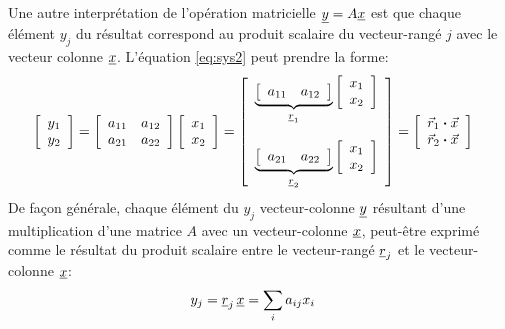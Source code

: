 Une autre interprétation de l'opération matricielle $\underline{y} = A \underline{x}$ est que chaque élément $y_j$ du résultat correspond au produit scalaire du vecteur-rangé $j$ avec le vecteur colonne $\underline{x}$. L'équation \eqref{eq:sys2} peut prendre la forme:
\begin{align}
\left[ \begin{array}{c} 
	y_1 \\ y_2
\end{array} \right] &= 
\left[ \begin{array}{c c} 
a_{11} & a_{12} \\ a_{21} & a_{22}
\end{array} \right]
\left[ \begin{array}{c} 
	x_1 \\ x_2
\end{array} \right] = 
\left[ \begin{array}{c} 
\underbrace{
\left[ \begin{array}{c c} 
a_{11} & a_{12} 
\end{array} \right]
}_{\underline{r}_1}
\left[ \begin{array}{c} 
	x_1 \\ x_2
\end{array} \right] 
	\\ \\
\underbrace{
\left[ \begin{array}{c c} 
a_{21} & a_{22} 
\end{array} \right]
}_{\underline{r}_2}
\left[ \begin{array}{c} 
	x_1 \\ x_2
\end{array} \right] 
\end{array} \right] 
= 
\left[ \begin{array}{c} 
\vec{r}_1 \boldsymbol{\cdot} \vec{x}
\\
\vec{r}_2 \boldsymbol{\cdot} \vec{x}
\end{array} \right]
\end{align}
De façon générale, chaque élément du $y_j$ vecteur-colonne $\underline{y}$ résultant d'une multiplication d'une matrice $A$ avec un vecteur-colonne $\underline{x}$, peut-être exprimé comme le résultat du produit scalaire entre le vecteur-rangé $\underline{r}_j$ et le vecteur-colonne $\underline{x}$:
\begin{align}
y_j
&= \underline{r}_j \, \underline{x} = \sum_i a_{ij} x_i
\end{align}


